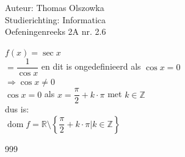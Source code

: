 \documentclass[a4paper]{article}
\begin{document}
\noindent \large Auteur: Thomas Olszowka \\
\noindent \large Studierichting: Informatica\\
\noindent \large Oefeningenreeks 2A nr. 2.6\\

\medskip

\normalsize

$f(x) = \sec x$ \\

$= \dfrac{1}{\cos x}$ en dit is ongedefinieerd als $\cos x = 0$\\

$\Rightarrow \cos x \neq 0$ \\

$\cos x = 0$ als $x = \dfrac{\pi}{2} + k \cdot\pi$ met $ k \in \mathbb{Z}$\\

dus is: \\

$\operatorname{dom}f = \mathbb{R} \setminus \left\{ \dfrac{\pi}{2} + k \cdot \pi | k \in \mathbb{Z} \right\}$\\

\begin{thebibliography}{999}
\end{thebibliography}
\end{document}
